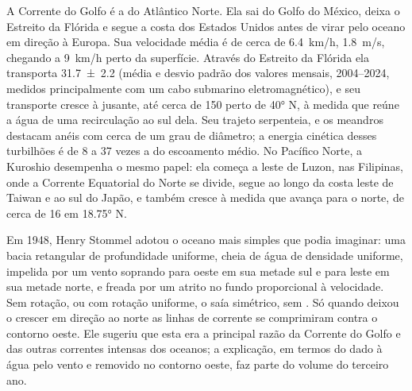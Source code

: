 A Corrente do Golfo é a  do Atlântico Norte. Ela sai
do Golfo do México, deixa o Estreito da Flórida e segue a costa dos
Estados Unidos antes de virar pelo oceano em direção à Europa. Sua velocidade média
é de cerca de \qty{6.4}{km/h}, \qty{1.8}{m/s}, chegando a \qty{9}{km/h} perto da
superfície. Através do Estreito da Flórida ela transporta
\qty[uncertainty-mode=separate]{31.7 \pm 2.2}{\sverdrup} (média e desvio padrão dos
valores mensais, 2004--2024, medidos principalmente com um cabo submarino
eletromagnético), e seu transporte cresce
à jusante, até cerca de \qty{150}{\sverdrup} perto de \ang{40} N, à medida que reúne a água
de uma recirculação ao sul dela. Seu trajeto serpenteia, e os meandros destacam anéis
com cerca de um grau de diâmetro; a energia cinética desses turbilhões é de 8 a 37 vezes a do
escoamento médio. No Pacífico Norte, a Kuroshio desempenha o mesmo papel: ela começa a
leste de Luzon, nas Filipinas, onde a Corrente Equatorial do Norte se divide, segue ao longo da
costa leste de Taiwan e ao sul do Japão, e também cresce à medida que avança para o norte, de cerca de
\qty{16}{\sverdrup} em \ang{18.75} N.

\begin{history}[Stommel, 1948]
Em 1948, Henry Stommel adotou o oceano mais simples que podia imaginar: uma bacia retangular
de profundidade uniforme, cheia de água de densidade uniforme, impelida por um vento soprando
para oeste em sua metade sul e para leste em sua metade norte, e
freada por um atrito no fundo proporcional à velocidade. Sem rotação,
ou com rotação uniforme, o  saía simétrico, sem . Só quando deixou o  crescer em direção ao norte as
linhas de corrente se comprimiram contra o contorno oeste. Ele sugeriu que esta era a
principal razão da Corrente do Golfo e das outras correntes intensas dos oceanos; a
explicação, em termos do  dado à água pelo vento e removido no contorno oeste, faz
parte do volume do terceiro ano.
\end{history}

